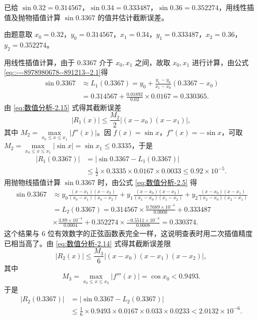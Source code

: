 \documentclass[../../main.tex]{subfiles}%
\begin{document}
\begin{example}
已给 $\sin 0.32 = 0.314567$，$\sin 0.34 = 0.333487$，$\sin 0.36 = 0.352274$，用线性插值及抛物插值计算 $\sin 0.3367$ 的值并估计截断误差。
\end{example}
\begin{solution}
由题意取 $x_0 = 0.32$，$y_0 = 0.314567$，$x_1 = 0.34$，$y_1 = 0.333487$，$x_2 = 0.36$，$y_2 = 0.352274$。

用线性插值计算，由于 $0.3367$ 介于 $x_0, x_1$ 之间，故取 $x_0, x_1$ 进行计算，由公式\eqref{eq::---8978980678--891213--2.1}得 
\begin{align*}
\sin 0.3367 &\approx L_1(0.3367) = y_0 + \frac{y_1 - y_0}{x_1 - x_0}(0.3367 - x_0) \\
&= 0.314567 + \frac{0.01892}{0.02} \times 0.0167 = 0.330365.
\end{align*}
由 \eqref{eq:数值分析-2.15} 式得其截断误差 
\[
|R_1(x)| \leqslant \frac{M_2}{2} |(x - x_0)(x - x_1)|,
\]
其中 $M_2 = \max\limits_{x_0 \leqslant x \leqslant x_1} |f''(x)|$。因 $f(x) = \sin x$，$f''(x) = -\sin x$，可取 $M_2 = \max\limits_{x_0 \leqslant x \leqslant x_1} |\sin x| = \sin x_1 \leqslant 0.3335$，于是 
\begin{align*}
|R_1(0.3367)| &= |\sin 0.3367 - L_1(0.3367)| \\
&\leqslant \frac{1}{2} \times 0.3335 \times 0.0167 \times 0.0033 \leqslant 0.92 \times 10^{-5}.
\end{align*}
用抛物线插值计算 $\sin 0.3367$ 时，由公式 \eqref{eq:数值分析-2.5} 得 
\begin{align*}
\sin 0.3367 &\approx y_0 \frac{(x - x_1)(x - x_2)}{(x_0 - x_1)(x_0 - x_2)} + y_1 \frac{(x - x_0)(x - x_2)}{(x_1 - x_0)(x_1 - x_2)} + y_2 \frac{(x - x_0)(x - x_1)}{(x_2 - x_0)(x_2 - x_1)} \\
&= L_2(0.3367) = 0.314567 \times \frac{0.7689 \times 10^{-4}}{0.0008} + 0.333487 \\
&\times \frac{3.89 \times 10^{-4}}{0.0004} + 0.352274 \times \frac{-0.5511 \times 10^{-4}}{0.0008} = 0.330374.
\end{align*}
这个结果与 6 位有效数字的正弦函数表完全一样，这说明查表时用二次插值精度已相当高了。由 \eqref{eq:数值分析-2.14} 式得其截断误差限 
\[
|R_2(x)| \leqslant \frac{M_3}{6} |(x - x_0)(x - x_1)(x - x_2)|,
\]
其中 
\[
M_3 = \max\limits_{x_0 \leqslant x \leqslant x_2} |f'''(x)| = \cos x_0 < 0.9493.
\]
于是 
\begin{align*}
|R_2(0.3367)| &= |\sin 0.3367 - L_2(0.3367)| \\
&\leqslant \frac{1}{6} \times 0.9493 \times 0.0167 \times 0.033 \times 0.0233 < 2.0132 \times 10^{-6}.
\end{align*}

\end{solution}
\end{document}
